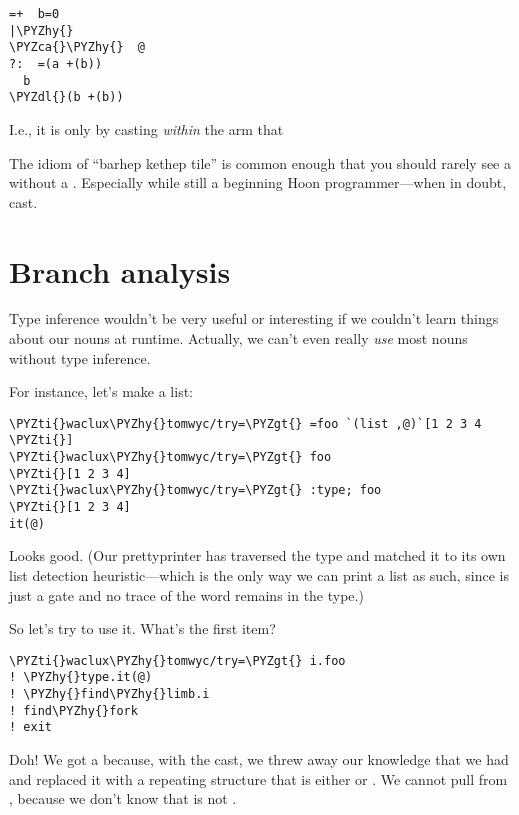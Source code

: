 \begin{framed_shaded}
\begin{Verbatim}[fontsize=\relsize{-2.5},fontseries=b,commandchars=\\\{\}]
=+  b=0
|\PYZhy{}  
\PYZca{}\PYZhy{}  @
?:  =(a +(b))
  b
\PYZdl{}(b +(b))
\end{Verbatim}
\end{framed_shaded}
I.e., it is only by casting \emph{within} the arm that 

The idiom of ``barhep kethep tile'' is common enough that you
should rarely see a \kode{\textbar{}-} without a \kode{\ket -}.  Especially while
still a beginning Hoon programmer---when in doubt, cast.

\section{Branch analysis}

Type inference wouldn't be very useful or interesting if we
couldn't learn things about our nouns at runtime.  Actually,
we can't even really \emph{use} most nouns without type inference.

For instance, let's make a list:

\begin{framed_shaded}
\begin{Verbatim}[fontsize=\relsize{-2.5},fontseries=b,commandchars=\\\{\}]
\PYZti{}waclux\PYZhy{}tomwyc/try=\PYZgt{} =foo `(list ,@)`[1 2 3 4 \PYZti{}]
\PYZti{}waclux\PYZhy{}tomwyc/try=\PYZgt{} foo
\PYZti{}[1 2 3 4]
\PYZti{}waclux\PYZhy{}tomwyc/try=\PYZgt{} :type; foo
\PYZti{}[1 2 3 4]
it(@)
\end{Verbatim}
\end{framed_shaded}
Looks good.  (Our prettyprinter has traversed the  type and
matched it to its own list detection heuristic---which is the
only way we can print a list as such, since  is just a
gate and no trace of the word  remains in the type.)

So let's try to use it.  What's the first item?

\begin{framed_shaded}
\begin{Verbatim}[fontsize=\relsize{-2.5},fontseries=b,commandchars=\\\{\}]
\PYZti{}waclux\PYZhy{}tomwyc/try=\PYZgt{} i.foo
! \PYZhy{}type.it(@)
! \PYZhy{}find\PYZhy{}limb.i
! find\PYZhy{}fork
! exit
\end{Verbatim}
\end{framed_shaded}
Doh!  We got a  because, with the cast, we threw away
our knowledge that we had \kode{[1 2 3 4 \sig ]} and replaced it with a
repeating structure that is either \kode{\sig } or \kode{[i=@ t=(list ,@)]}.
We cannot pull  from , because we don't know that 
is not \kode{\sig }.

